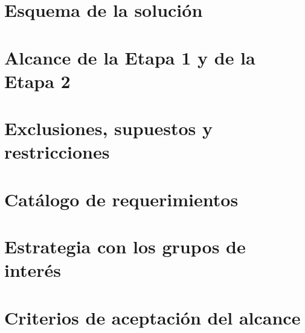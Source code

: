 
\begin{resumenApertura}
\begin{recibe}
  \item {}
\end{recibe}
\end{resumenApertura}

\section{Esquema de la solución}\label{sec:3-esquema-de-la-solucion}


\section{Alcance de la Etapa 1 y de la Etapa 2}\label{sec:3-alcance-de-la-etapa-1-y-de-la-et}


\section{Exclusiones, supuestos y restricciones}\label{sec:3-exclusiones-supuestos-y-restricc}


\section{Catálogo de requerimientos}\label{sec:3-catalogo-de-requerimientos}


\section{Estrategia con los grupos de interés}\label{sec:3-estrategia-con-los-grupos-de-int}


\section{Criterios de aceptación del alcance}\label{sec:3-criterios-de-aceptacion-del-alca}

